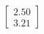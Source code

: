 \documentclass[preview]{standalone}
\begin{document}
\begin{align*}
\begin{bmatrix} 2.50 \\ 3.21 \end{bmatrix}
\end{align*}
\end{document}
